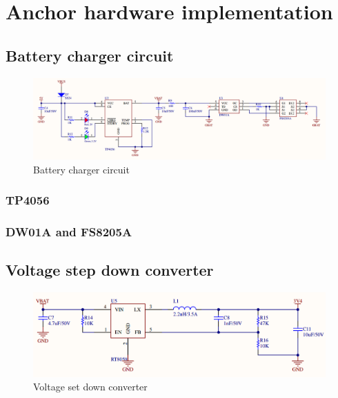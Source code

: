 \documentclass[../../main.tex]{subfiles}
\begin{document}
\graphicspath{{img/}{04_hardware/img/}}

\chapter{Anchor hardware implementation}

\section{Battery charger circuit}

\begin{figure}[H]
    \begin{center}
        \includegraphics[scale=0.35]{battery_charger_circuit.png}
    \end{center}
    \caption{Battery charger circuit}
    \label{fig:battery_charger_circuit}
\end{figure}

\subsection{TP4056}

\subsection{DW01A and FS8205A}

\section{Voltage step down converter}
\begin{figure}[H]
    \begin{center}
        \includegraphics[scale=0.5]{voltage_set_down_converter.png}
    \end{center}
    \caption{Voltage set down converter}
    \label{fig:voltage_set_down_converter}
\end{figure}
\end{document}

